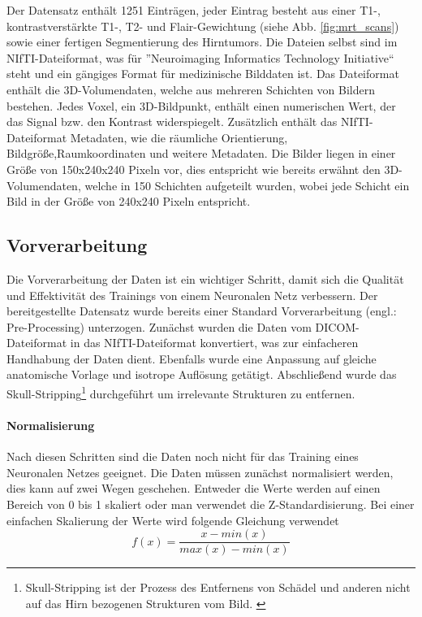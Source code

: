 Der Datensatz enthält 1251 Einträgen, jeder Eintrag besteht aus einer T1-, kontrastverstärkte T1-, T2- und Flair-Gewichtung (siehe Abb. \ref{fig:mrt_scans}) sowie einer fertigen Segmentierung des Hirntumors. Die Dateien selbst sind im NIfTI-Dateiformat, was für ''Neuroimaging Informatics Technology Initiative`` steht und ein gängiges Format für medizinische Bilddaten ist. Das Dateiformat enthält die 3D-Volumendaten, welche aus mehreren Schichten von Bildern bestehen. Jedes Voxel, ein 3D-Bildpunkt, enthält einen numerischen Wert, der das Signal bzw. den Kontrast widerspiegelt. Zusätzlich enthält das NIfTI-Dateiformat Metadaten, wie die räumliche Orientierung, Bildgröße,Raumkoordinaten und weitere Metadaten. \cite[][]{NIfTI} Die Bilder liegen in einer Größe von 150x240x240 Pixeln vor, dies entspricht wie bereits erwähnt den 3D-Volumendaten, welche in 150 Schichten aufgeteilt wurden, wobei jede Schicht ein Bild in der Größe von 240x240 Pixeln entspricht.


\subsection{Vorverarbeitung}
Die Vorverarbeitung der Daten ist ein wichtiger Schritt, damit sich die Qualität und Effektivität des Trainings von einem Neuronalen Netz verbessern. Der bereitgestellte Datensatz wurde bereits einer Standard Vorverarbeitung (engl.: Pre-Processing) unterzogen. Zunächst wurden die Daten vom DICOM-Dateiformat in das NIfTI-Dateiformat konvertiert, was zur einfacheren Handhabung der Daten dient. Ebenfalls wurde eine Anpassung auf gleiche anatomische Vorlage und isotrope Auflösung getätigt. Abschließend wurde  das Skull-Stripping\footnote{Skull-Stripping ist der Prozess des Entfernens von Schädel und anderen nicht auf das Hirn bezogenen Strukturen vom Bild. \cite[vgl.][]{SwiebockaWiek2016}} durchgeführt um irrelevante Strukturen zu entfernen. \cite[vgl.][]{Baid2021}

\paragraph{Normalisierung}
Nach diesen Schritten sind die Daten noch nicht für das Training eines Neuronalen Netzes geeignet. Die Daten müssen zunächst normalisiert werden, dies kann auf zwei Wegen geschehen. Entweder die Werte werden auf einen Bereich von 0 bis 1 skaliert oder man verwendet die Z-Standardisierung. Bei einer einfachen Skalierung der Werte wird folgende Gleichung verwendet
\begin{equation}
	f(x)=\frac{x - min(x)}{max(x) - min(x)}
\end{equation}

